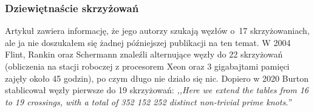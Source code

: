 \subsubsection{Dziewiętnaście skrzyżowań}
Artykuł \cite{thistlethwaite98} zawiera informację, że jego autorzy szukają węzłów o~17 skrzyżowaniach, ale ja nie doszukałem się żadnej późniejszej publikacji na ten temat.
%
%
%
W 2004 Flint, Rankin oraz Schermann \cite{rankin04} znaleźli alternujące węzły do 22 skrzyżowań (obliczenia na stacji roboczej z procesorem Xeon oraz 3 gigabajtami pamięci zajęły około 45 godzin), po czym długo nie działo się nic.
%
%
%
Dopiero w 2020 Burton \cite{burton20} stablicował węzły pierwsze do 19 skrzyżowań: \emph{,,Here we extend the tables from 16 to 19 crossings, with a total of 352 152 252 distinct non-trivial prime knots.''}
%